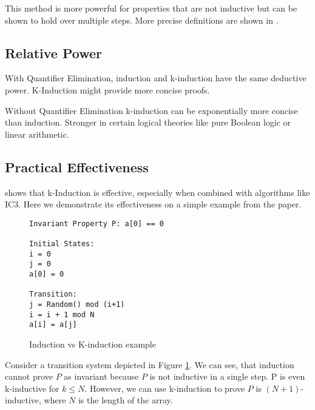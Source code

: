 This method is more powerful for properties that are not inductive but can be shown to hold over multiple steps.
More precise definitions are shown in \cite{7886665}.

\subsection*{Relative Power}
\noindent With Quantifier Elimination, induction and k-induction have the same deductive power. K-Induction might provide more concise proofs.

Without Quantifier Elimination k-induction can be exponentially more concise than induction. Stronger in certain logical theories like pure Boolean logic or linear arithmetic.

\subsection*{Practical Effectiveness}
\noindent \cite{7886665} shows that k-Induction is effective, especially when combined with algorithms like IC3.
Here we demonstrate its effectiveness on a simple example from the paper\cite{7886665}.

\newpage

\begin{figure}
\begin{mdframed}
\begin{lstlisting}
Invariant Property P: a[0] == 0

Initial States:
i = 0
j = 0
a[0] = 0

Transition:
j = Random() mod (i+1)
i = i + 1 mod N
a[i] = a[j]
\end{lstlisting}
    \caption{Induction vs K-induction example}\label{ex:ind vs kind}
\end{mdframed}
\end{figure}

\vspace{\baselineskip}Consider a transition system depicted in Figure \ref{ex:ind vs kind}.
We can see, that induction cannot prove \( P \) as invariant because \( P \) is not inductive in a single step. P is even k-inductive for $k \leq N$. However, we can use k-induction to prove \( P \) is \( (N+1) \)-inductive, where \( N \) is the length of the array.


